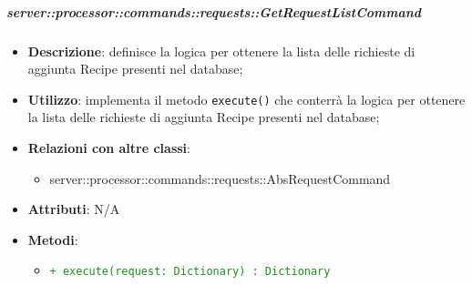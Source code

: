         \subparagraph{server::processor::commands::requests::GetRequestListCommand} %
        \label{subp:bdsm_app_server_processor_commands_requests_getrequestlistcommand}
        \begin{itemize}
          \item \textbf{Descrizione}: definisce la logica per ottenere la lista delle richieste di aggiunta Recipe presenti nel database;
          \item \textbf{Utilizzo}: implementa il metodo \texttt{execute()} che conterrà la logica per ottenere la lista delle richieste di aggiunta Recipe presenti nel database;
          \item \textbf{Relazioni con altre classi}:
            \begin{itemize}
              \item server::processor::commands::requests::AbsRequestCommand
            \end{itemize}
          \item \textbf{Attributi}: N/A
          \item \textbf{Metodi}:
          \begin{itemize}
              \item \textcolor{forestgreen}{\texttt{+ execute(request: Dictionary) : Dictionary}}
          \end{itemize}
        \end{itemize}

